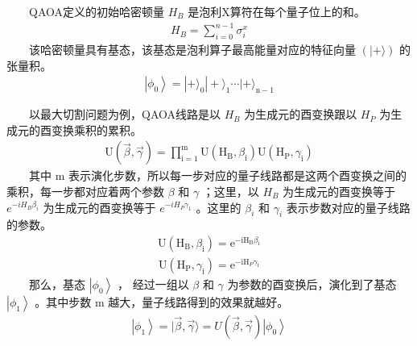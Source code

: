 \documentclass[a4paper,11pt,english]{sphinxmanual}
\begin{document}
\sphinxAtStartPar
{}

\sphinxAtStartPar
  QAOA定义的初始哈密顿量 \(H_{B}\) 是泡利X算符在每个量子位上的和。
\begin{equation*}
\begin{split}H_{B}=\sum_{i=0}^{n-1} \sigma_{i}^{x}\end{split}
\end{equation*}
\sphinxAtStartPar
  该哈密顿量具有基态，该基态是泡利算子最高能量对应的特征向量  \((|+\rangle)\) 的张量积。
\begin{equation*}
\begin{split}\left|\phi_{0}\right\rangle=|+\rangle_{0}|+\rangle_{1} \cdots|+\rangle_{\mathrm{n}-1}\end{split}
\end{equation*}
\sphinxAtStartPar
{}

\sphinxAtStartPar
  以最大切割问题为例，QAOA线路是以 \(H_B\) 为生成元的酉变换跟以 \(H_P\) 为生成元的酉变换乘积的累积。
\begin{equation*}
\begin{split}\mathrm{U}(\vec{\beta}, \vec{\gamma})=\prod_{\mathrm{i}=1}^{\mathrm{m}} \mathrm{U}\left(\mathrm{H}_{\mathrm{B}}, \beta_{\mathrm{i}}\right) \mathrm{U}\left(\mathrm{H}_{\mathrm{P}}, \gamma_{\mathrm{i}}\right)\end{split}
\end{equation*}
\sphinxAtStartPar
  其中  \(\mathrm{m}\) 表示演化步数，所以每一步对应的量子线路都是这两个酉变换之间的乘积，每一步都对应着两个参数 \(\beta\) 和  \({\gamma}\) ；这里，以  \(H_{B}\) 为生成元的酉变换等于 \(e^{-i H_B \beta_i}\) 为生成元的酉变换等于  \(e^{-i H_{P} \gamma_{1}}\) 。这里的  \(\beta_{i}\) 和  \(\gamma_{i}\) 表示步数对应的量子线路的参数。
\begin{equation*}
\begin{split}\mathrm{U}\left(\mathrm{H}_{\mathrm{B}}, \beta_{\mathrm{i}}\right)=\mathrm{e}^{-\mathrm{iH}_{\mathrm{B}} \beta_{\mathrm{i}}}\end{split}
\end{equation*}\begin{equation*}
\begin{split}\mathrm{U}\left(\mathrm{H}_{\mathrm{P}}, \gamma_{\mathrm{i}}\right)=\mathrm{e}^{-\mathrm{iH}_{P} \gamma_{\mathrm{i}}}\end{split}
\end{equation*}
\sphinxAtStartPar
  那么，基态  \(\left|\phi_{0}\right\rangle\) ， 经过一组以 \(\beta\) 和 \(\gamma\) 为参数的酉变换后，演化到了基态  \(\left|\phi_{1}\right\rangle\) 。其中步数  \(\mathrm{m}\) 越大，量子线路得到的效果就越好。
\begin{equation*}
\begin{split}\left|\phi_{1}\right\rangle=|\vec{\beta}, \vec{\gamma}\rangle=U(\vec{\beta}, \vec{\gamma})\left|\phi_{0}\right\rangle\end{split}
\end{equation*}
\sphinxAtStartPar
{}
\end{document}
